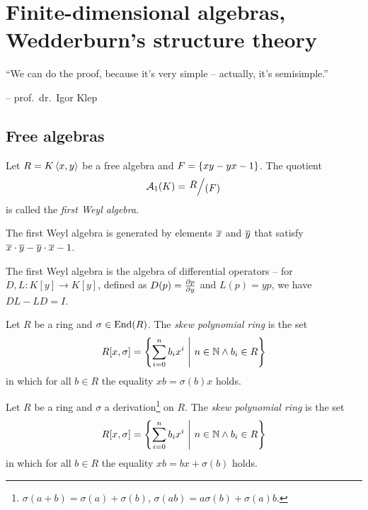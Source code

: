 \section{Finite-dimensional algebras, Wedderburn's structure theory}

\epigraph{``We can do the proof, because it's very simple --
actually, it's semisimple.''}{-- prof.~dr.~Igor Klep}

\subsection{Free algebras}


\begin{definicija}
Let $R = K \left\langle x, y\right\rangle$ be a free algebra and
$F = \left\{xy - yx - 1\right\}$. The quotient
\[
\mathcal{A}_1(K) = \kvoc{R}{(F)}
\]
is called the \emph{first Weyl algebra}.
\end{definicija}

\begin{opomba}
The first Weyl algebra is generated by elements $\overline{x}$ and
$\overline{y}$ that satisfy
$\overline{x} \cdot \overline{y} - \overline{y} \cdot \overline{x} - 1$.
\end{opomba}

\begin{opomba}
The first Weyl algebra is the algebra of differential operators --
for $D, L \colon K[y] \to K[y]$, defined as $D(p) = \frac{\partial p}{\partial y}$
and $L(p) = yp$, we have $DL - LD = I$.
\end{opomba}

\begin{definicija}
Let $R$ be a ring and $\sigma \in \operatorname{End}(R)$. The
\emph{skew polynomial ring} is the set
\[
R[x, \sigma] =
\left\{\sum_{i=0}^n b_i x^i~\middle\vert~n \in \mathbb{N} \land b_i \in R\right\}
\]
in which for all $b \in R$ the equality $x b = \sigma(b) x$ holds.
\end{definicija}

\begin{definicija}
Let $R$ be a ring and $\sigma$ a
derivation\footnote{$\sigma(a+b) = \sigma(a) + \sigma(b)$,
$\sigma(ab) = a\sigma(b) + \sigma(a)b$.} on $R$. The
\emph{skew polynomial ring} is the set
\[
R[x, \sigma] =
\left\{\sum_{i=0}^n b_i x^i~\middle\vert~n \in \mathbb{N} \land b_i \in R\right\}
\]
in which for all $b \in R$ the equality $x b = b x + \sigma(b)$
holds.
\end{definicija}

